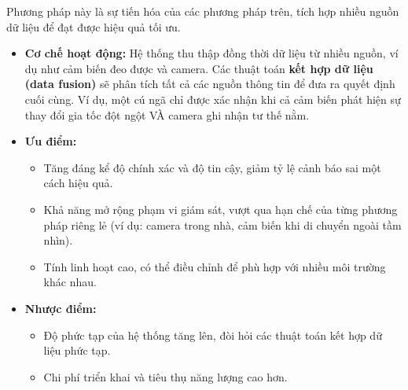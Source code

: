 Phương pháp này là sự tiến hóa của các phương pháp trên, tích hợp nhiều nguồn dữ liệu để đạt được hiệu quả tối ưu.
\begin{itemize}
    \item \textbf{Cơ chế hoạt động:} Hệ thống thu thập đồng thời dữ liệu từ nhiều nguồn, ví dụ như cảm biến đeo được và camera. Các thuật toán \textbf{kết hợp dữ liệu (data fusion)} sẽ phân tích tất cả các nguồn thông tin để đưa ra quyết định cuối cùng. Ví dụ, một cú ngã chỉ được xác nhận khi cả cảm biến phát hiện sự thay đổi gia tốc đột ngột VÀ camera ghi nhận tư thế nằm.
    \item \textbf{Ưu điểm:} 
    \begin{itemize}
        \item Tăng đáng kể độ chính xác và độ tin cậy, giảm tỷ lệ cảnh báo sai một cách hiệu quả.
        \item Khả năng mở rộng phạm vi giám sát, vượt qua hạn chế của từng phương pháp riêng lẻ (ví dụ: camera trong nhà, cảm biến khi di chuyển ngoài tầm nhìn).
        \item Tính linh hoạt cao, có thể điều chỉnh để phù hợp với nhiều môi trường khác nhau.
    \end{itemize}
    \item \textbf{Nhược điểm:}
    \begin{itemize}
        \item Độ phức tạp của hệ thống tăng lên, đòi hỏi các thuật toán kết hợp dữ liệu phức tạp.
        \item Chi phí triển khai và tiêu thụ năng lượng cao hơn.
    \end{itemize}
\end{itemize}
